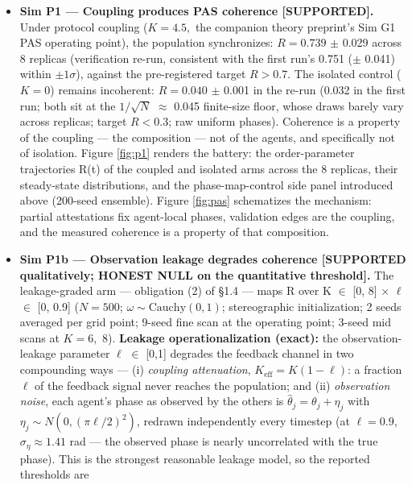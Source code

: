 \documentclass[11pt,twocolumn]{article}
\providecommand{\tightlist}{\setlength{\itemsep}{0pt}\setlength{\parskip}{0pt}}
\begin{document}
\begin{itemize}
\tightlist
\item
  \textbf{Sim P1 --- Coupling produces PAS coherence {[}SUPPORTED{]}.}
  Under protocol coupling (\(K = 4.5,\) the companion theory preprint's Sim G1 PAS operating
  point), the population synchronizes: \(R = 0.739\) \(\pm\) 0.029
  across 8 replicas (verification re-run, consistent with the first run's 0.751
  (\(\pm\) 0.041) within \(\pm 1\sigma\)), against the
  pre-registered target \(R > 0.7.\) The isolated control (\(K = 0\))
  remains incoherent: \(R = 0.040\) \(\pm\) 0.001 in the re-run (0.032
  in the first run; both sit at the \(1/\sqrt{N}\) \(\approx\) 0.045 finite-size
  floor, whose draws barely vary across replicas; target \(R < 0.3\);
  raw uniform phases). Coherence is a property of the coupling --- the
  composition --- not of the agents, and specifically not of isolation.
  Figure \ref{fig:p1} renders the battery: the order-parameter
  trajectories R(t) of the coupled and isolated arms across the 8
  replicas, their steady-state distributions, and the phase-map-control side panel introduced above (200-seed ensemble).
  Figure \ref{fig:pas} schematizes the mechanism: partial attestations
  fix agent-local phases, validation edges are the coupling, and the
  measured coherence is a property of that composition.
\item
  \textbf{Sim P1b --- Observation leakage degrades coherence
  {[}SUPPORTED qualitatively; HONEST NULL on the quantitative
  threshold{]}.} The leakage-graded arm --- obligation (2) of §1.4 --- maps R over K \(\in\) {[}0, 8{]} \(\times\)
  \(\ell\) \(\in\) {[}0, 0.9{]} (\(N = 500\);
  \(\omega \sim \mathrm{Cauchy}(0,1)\); stereographic initialization; 2
  seeds averaged per grid point; 9-seed fine scan at the operating
  point; 3-seed mid scans at \(K = 6,\) 8). \textbf{Leakage
  operationalization (exact):} the observation-leakage parameter
  \(\ell\) \(\in\) {[}0,1{]} degrades the feedback channel in two
  compounding ways --- (i) \emph{coupling attenuation},
  \(K_{\mathrm{eff}} = K(1 - \ell)\): a fraction \(\ell\) of the
  feedback signal never reaches the population; and (ii)
  \emph{observation noise}, each agent's phase as observed by the others
  is \(\hat{\theta}_j = \theta_j + \eta_j\) with
  \(\eta_j \sim N(0, (\pi\ell/2)^2)\), redrawn independently every
  timestep (at \(\ell = 0.9\), \(\sigma_\eta \approx 1.41\) rad --- the
  observed phase is nearly uncorrelated with the true phase). This is
  the strongest reasonable leakage model, so the reported thresholds are

\end{itemize}
\end{document}

